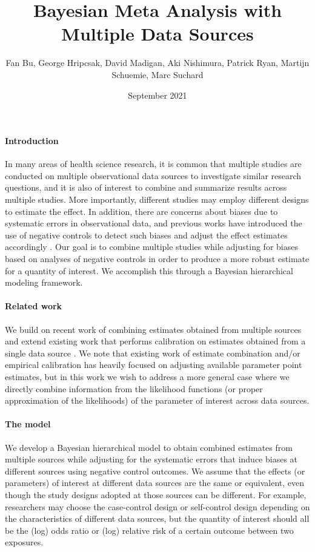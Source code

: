 \documentclass{article}
\title{Bayesian Meta Analysis with Multiple Data Sources}
\author{Fan Bu, George Hripcsak, David Madigan, Aki Nishimura, Patrick Ryan, Martijn Schuemie, Marc Suchard}
\date{September 2021}
\begin{document}
\maketitle


\paragraph{Introduction} In many areas of health science research, it is common that multiple studies are conducted on multiple observational data sources to investigate similar research questions,
and it is also of interest to combine and summarize results across multiple studies.
More importantly, different studies may employ different designs to estimate the effect.
In addition, there are concerns about biases due to systematic errors in observational data,
and previous works have introduced the use of negative controls to detect such biases and adjust the effect estimates accordingly \citep{lipsitch2010negative,arnold2016brief,schuemie2018empirical}.
Our goal is to combine multiple studies while adjusting for biases based on analyses of negative controls in order to produce a more robust estimate for a quantity of interest.
We accomplish this through a Bayesian hierarchical modeling framework.


\paragraph{Related work}
We build on recent work of combining estimates obtained from multiple sources \citep{yao2021bivariate}
and extend existing work that performs calibration on estimates obtained from a single data source \citep{mulgrave2020bayesian}.
We note that existing work of estimate combination and/or empirical calibration has heavily focused on adjusting available parameter point estimates,
but in this work we wish to address a more general case where we directly combine information from the likelihood functions (or proper approximation of the likelihoods) of the parameter of interest across data sources.

\paragraph{The model}
We develop a Bayesian hierarchical model to obtain combined estimates from multiple sources
while adjusting for the systematic errors that induce biases at different sources using negative control outcomes.
We assume that the effects (or parameters) of interest at different data sources are the same or equivalent, even though the study designs adopted at those sources can be different.
For example, researchers may choose the case-control design or self-control design depending on the characteristics of different data sources,
but the quantity of interest should all be the (log) odds ratio or (log) relative risk of a certain outcome between two exposures.
\end{document}
